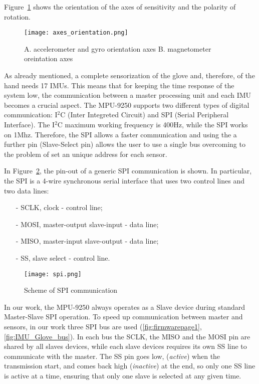 Figure~\ref{fig:axes} shows the orientation of the axes of sensitivity and the polarity of rotation.
\begin{figure}[h]
\centering
\texttt{[image: axes\_orientation.png]}
\caption{A. accelerometer and gyro orientation axes  B. magnetometer oreintation axes}
\label{fig:axes}
\end{figure}

As already mentioned, a complete sensorization of the glove and, therefore, of the hand needs 17 IMUs. This means that for keeping the time response of the system low, the communication between a master processing unit and each IMU becomes a crucial aspect. The MPU-9250 supports two different types of digital communication: I$^2$C (Inter Integreted Circuit) and SPI (Serial Peripheral Interface). The I$^2$C maximum working frequency is 400Hz, while the SPI works on 1Mhz. Therefore, the SPI allows a faster communication and using the a further pin (Slave-Select pin) allows the user to use a single bus overcoming to the problem of set an unique address for each sensor.

In Figure~\ref{fig:spi}, the pin-out of a generic SPI communication is shown. In particular, the SPI is a 4-wire synchronous serial interface that uses two control lines and two data lines:
\begin{itemize}
\item[-] SCLK, clock - control line;
\item[-] MOSI, master-output slave-input - data line;
\item[-] MISO, master-input slave-output - data line;
\item[-] SS,   slave select - control line.
\end{itemize}

\begin{figure}[h]
\centering
\texttt{[image: spi.png]}
\caption{Scheme of SPI communication}
\label{fig:spi}
\end{figure}

In our work, the MPU-9250 always operates as a Slave device during standard Master-Slave SPI operation. To speed up communication between master and sensors, in our work three SPI bus are used (\ref{fig:firmwarepage1}, \ref{fig:IMU_Glove_bus}).  In each bus the SCLK, the MISO and the MOSI pin are shared by all slaves devices, while each slave devices requires its own SS line to communicate with the master. The SS pin goes low, (\textit{active}) when the transmission start, and comes back high (\textit{inactive}) at the end, so only one SS line is active at a time, ensuring that only one slave is selected at any given time.

